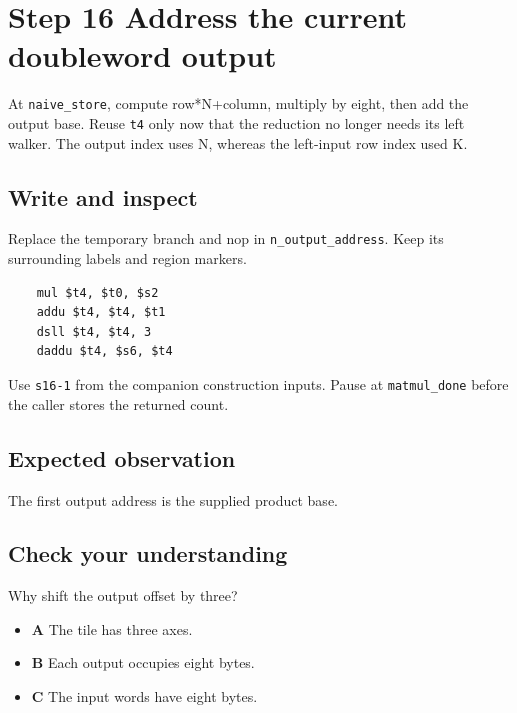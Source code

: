 \section{Step 16 Address the current doubleword output}\label{matmul-s16}

At \texttt{naive\_store}, compute row*N+column, multiply by eight, then add the output base. Reuse \texttt{t4} only now that the reduction no longer needs its left walker. The output index uses N, whereas the left-input row index used K.

\subsection{Write and inspect}
Replace the temporary branch and nop in \texttt{n\_output\_address}. Keep its surrounding labels and region markers.

\begin{verbatim}
    mul $t4, $t0, $s2
    addu $t4, $t4, $t1
    dsll $t4, $t4, 3
    daddu $t4, $s6, $t4
\end{verbatim}
Use \texttt{s16-1} from the companion construction inputs. Pause at \texttt{matmul\_done} before the caller stores the returned count.

\subsection{Expected observation}
The first output address is the supplied product base.

\subsection{Check your understanding}
Why shift the output offset by three?

\begin{itemize}
  \item \textbf{A} The tile has three axes.
  \item \textbf{B} Each output occupies eight bytes.
  \item \textbf{C} The input words have eight bytes.
\end{itemize}
